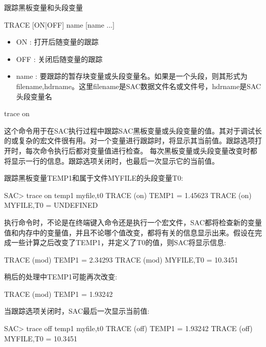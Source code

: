 \label{cmd:trace}

跟踪黑板变量和头段变量

\begin{SACSTX}
TRACE [ON|OFF] name [name ...]
\end{SACSTX}

\begin{itemize}
\item ON : 打开后随变量的跟踪 
\item OFF : 关闭后随变量的跟踪 
\item name : 要跟踪的暂存块变量或头段变量名。如果是一个头段，则其形式为filename,hdrname。这里filename是SAC数据文件名或文件号，hdrname是SAC头段变量名 
\end{itemize}

\begin{SACDFT}
trace on
\end{SACDFT}

这个命令用于在SAC执行过程中跟踪SAC黑板变量或头段变量的值。其对于调试长的或复杂的宏文件很有用。对一个变量进行跟踪时，将显示其当前值。跟踪选项打开时，每次命令执行后都对变量值进行检查。
每次黑板变量或头段变量改变时都将显示一行的信息。跟踪选项关闭时，也最后一次显示它的当前值。

跟踪黑板变量TEMP1和属于文件MYFILE的头段变量T0:
\begin{SACCode}
SAC> trace on temp1 myfile,t0
  TRACE  (on) TEMP1 = 1.45623
  TRACE  (on) MYFILE,T0 = UNDEFINED
\end{SACCode}

执行命令时，不论是在终端键入命令还是执行一个宏文件，SAC都将检查新的变量值和内存中的变量值，并且不论哪个值改变，都将有关的信息显示出来。假设在完成一些计算之后改变了TEMP1，并定义了T0的值，则SAC将显示信息:
\begin{SACCode}
  TRACE (mod) TEMP1 = 2.34293
  TRACE (mod) MYFILE,T0 = 10.3451
\end{SACCode}

稍后的处理中TEMP1可能再次改变:
\begin{SACCode}
  TRACE (mod) TEMP1 = 1.93242
\end{SACCode}

当跟踪选项关闭时，SAC最后一次显示当前值:
\begin{SACCode}
SAC> trace off temp1 myfile,t0
  TRACE (off) TEMP1 = 1.93242
  TRACE (off) MYFILE,T0 = 10.3451
\end{SACCode}
